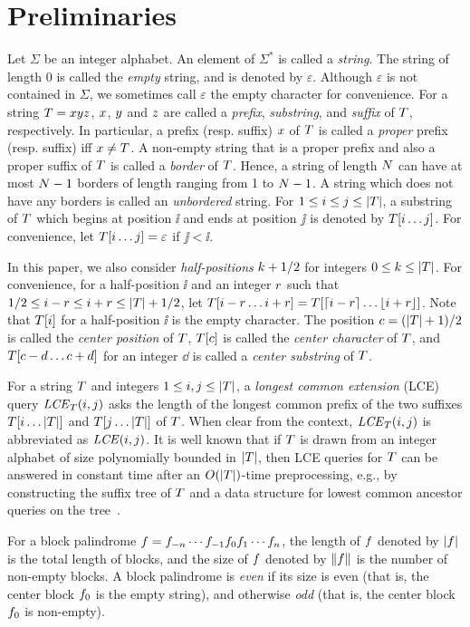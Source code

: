 \section{Preliminaries}

Let $\Sigma$ be an integer alphabet.
An element of $\Sigma^*$ is called a \emph{string}.
The string of length 0 is called the \emph{empty} string,
and is denoted by $\varepsilon$.
Although $\varepsilon$ is not contained in $\Sigma$,
we sometimes call $\varepsilon$ the empty character for convenience.
For a string $T=x y z$, $x$, $y$ and $z$ are called a \emph{prefix}, \emph{substring}, and \emph{suffix} of $T$, respectively.
In particular, a prefix (resp. suffix) $x$ of $T$ is called a \emph{proper} prefix (resp. suffix) iff $x \neq T$.
A non-empty string that is a proper prefix and also a proper suffix of $T$ is called a \emph{border} of $T$.
Hence, a string of length $N$ can have
at most $N-1$ borders of length ranging from 1 to $N-1$.
A string which does not have any borders is called an \emph{unbordered} string.
%
For $1 \leq i \leq j \leq |T|$,
a substring of $T$ which begins at position $\ii$ and ends at
position $\jj$ is denoted by $T[i \ldots j]$.
For convenience, let $T[i \ldots j] = \varepsilon$ if $\jj < \ii$.

In this paper, we also consider \emph{half-positions} $k+1/2$ for integers $0 \leq k \leq |T|$.
For convenience, for a half-position $\ii$ and an integer $r$ such that $1/2 \leq i-r \leq i + r \leq |T|+1/2$, let $T[i-r \ldots i+r] = T[\lceil i-r \rceil \ldots \lfloor i+r \rfloor]$.
Note that $T[i]$ for a half-position $\ii$ is the empty character.
The position $c=(|T|+1)/2$ is called the \emph{center position} of $T$,  $T[c]$ is called the \emph{center character} of $T$, and $T[c -d \ldots c+d]$ for an integer $\dd$ is  called a \emph{center substring} of $T$.

For a string $T$ and integers $1 \leq i, j \leq |T|$, a \emph{longest common extension} (LCE) query $\mathit{LCE}_T(i, j)$ asks the length of the longest common prefix of the two suffixes $T[i \ldots |T|]$ and $T[j \ldots |T|]$ of $T$.
When clear from the context, $\mathit{LCE}_T(i, j)$ is abbreviated as $\mathit{LCE}(i, j)$.
It is well known that if $T$ is drawn from an integer alphabet of size polynomially bounded in $|T|$, then 
LCE queries for $T$ can be answered in constant time
after an $O(|T|)$-time preprocessing, e.g.,
by constructing the suffix tree of $T$ and a data structure for lowest common ancestor queries on the tree~\cite{Gusfield1997AST}.

For a block palindrome $f=f_{-n} \cdots f_{-1} f_0 f_1 \cdots f_n$, the length of $f$ denoted by $|f|$ is the total length of blocks, and the size of $f$ denoted by $\|f\|$ is the number of non-empty blocks.
A block palindrome is \emph{even} if its size is even
(that is, the center block $f_0$ is the empty string),
and otherwise \emph{odd} (that is, the center block $f_0$ is non-empty).
